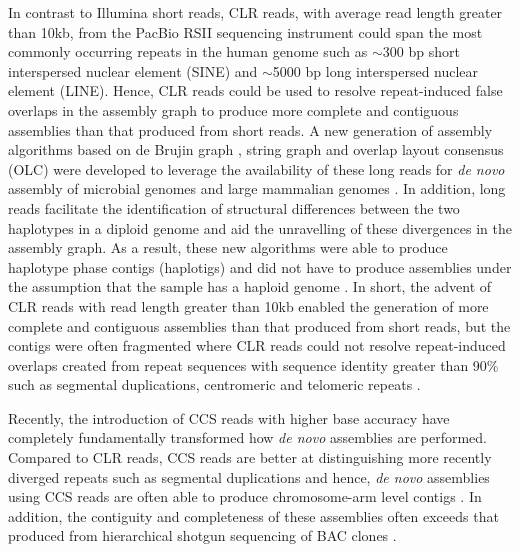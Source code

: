 In contrast to Illumina short reads, CLR reads, with average read length greater than 10kb, from the PacBio RSII sequencing instrument could span the most commonly occurring repeats in the human genome such as $\sim$300 bp short interspersed nuclear element (SINE) and $\sim$5000 bp long interspersed nuclear element (LINE). Hence, CLR reads could be used to resolve repeat-induced false overlaps in the assembly graph to produce more complete and contiguous assemblies than that produced from short reads. A new generation of assembly algorithms based on de Brujin graph \cite{Lin2016-vl}, string graph \cite{Myers2005-ei, Chin2016-at} and overlap layout consensus (OLC) \cite{Koren2017-cq} were developed to leverage the availability of these long reads for \textit{de novo} assembly of microbial genomes\cite{Chin2013-hp, Bashir2012-cs} and large mammalian genomes \cite{Chin2016-at, Koren2017-cq}. In addition, long reads facilitate the identification of structural differences between the two haplotypes in a diploid genome and aid the unravelling of these divergences in the assembly graph. As a result, these new algorithms were able to produce haplotype phase contigs (haplotigs) and did not have to produce assemblies under the assumption that the sample has a haploid genome \cite{Chin2016-at}.  In short, the advent of CLR reads with read length greater than 10kb enabled the generation of more complete and contiguous assemblies than that produced from short reads, but the contigs were often fragmented where CLR reads could not resolve repeat-induced overlaps created from repeat sequences with sequence identity greater than 90\% such as segmental duplications, centromeric and telomeric repeats \cite{}. 

Recently, the introduction of CCS reads with higher base accuracy have completely fundamentally transformed how \textit{de novo} assemblies are performed. Compared to CLR reads, CCS reads are better at distinguishing more recently diverged repeats such as segmental duplications and hence, \textit{de novo} assemblies using CCS reads are often able to produce chromosome-arm level contigs \cite{}. In addition, the contiguity and completeness of these assemblies often exceeds that produced from hierarchical shotgun sequencing of BAC clones \cite{Nurk2020-gu, Cheng2021-ij}. 

